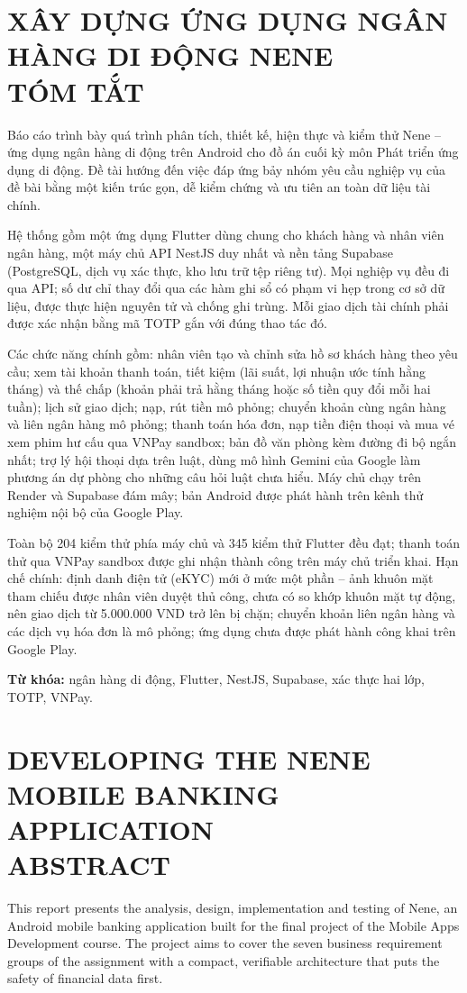 \chapter*{XÂY DỰNG ỨNG DỤNG NGÂN HÀNG DI ĐỘNG NENE\\TÓM TẮT}
Báo cáo trình bày quá trình phân tích, thiết kế, hiện thực và kiểm thử Nene -- ứng dụng ngân hàng di động trên Android cho đồ án cuối kỳ môn Phát triển ứng dụng di động. Đề tài hướng đến việc đáp ứng bảy nhóm yêu cầu nghiệp vụ của đề bài bằng một kiến trúc gọn, dễ kiểm chứng và ưu tiên an toàn dữ liệu tài chính.

Hệ thống gồm một ứng dụng Flutter dùng chung cho khách hàng và nhân viên ngân hàng, một máy chủ API NestJS duy nhất và nền tảng Supabase (PostgreSQL, dịch vụ xác thực, kho lưu trữ tệp riêng tư). Mọi nghiệp vụ đều đi qua API; số dư chỉ thay đổi qua các hàm ghi sổ có phạm vi hẹp trong cơ sở dữ liệu, được thực hiện nguyên tử và chống ghi trùng. Mỗi giao dịch tài chính phải được xác nhận bằng mã TOTP gắn với đúng thao tác đó.

Các chức năng chính gồm: nhân viên tạo và chỉnh sửa hồ sơ khách hàng theo yêu cầu; xem tài khoản thanh toán, tiết kiệm (lãi suất, lợi nhuận ước tính hằng tháng) và thế chấp (khoản phải trả hằng tháng hoặc số tiền quy đổi mỗi hai tuần); lịch sử giao dịch; nạp, rút tiền mô phỏng; chuyển khoản cùng ngân hàng và liên ngân hàng mô phỏng; thanh toán hóa đơn, nạp tiền điện thoại và mua vé xem phim hư cấu qua VNPay sandbox; bản đồ văn phòng kèm đường đi bộ ngắn nhất; trợ lý hội thoại dựa trên luật, dùng mô hình Gemini của Google làm phương án dự phòng cho những câu hỏi luật chưa hiểu. Máy chủ chạy trên Render và Supabase đám mây; bản Android được phát hành trên kênh thử nghiệm nội bộ của Google Play.

Toàn bộ 204 kiểm thử phía máy chủ và 345 kiểm thử Flutter đều đạt; thanh toán thử qua VNPay sandbox được ghi nhận thành công trên máy chủ triển khai. Hạn chế chính: định danh điện tử (eKYC) mới ở mức một phần -- ảnh khuôn mặt tham chiếu được nhân viên duyệt thủ công, chưa có so khớp khuôn mặt tự động, nên giao dịch từ 5.000.000 VND trở lên bị chặn; chuyển khoản liên ngân hàng và các dịch vụ hóa đơn là mô phỏng; ứng dụng chưa được phát hành công khai trên Google Play.

\textbf{Từ khóa:} ngân hàng di động, Flutter, NestJS, Supabase, xác thực hai lớp, TOTP, VNPay.

\newpage

\chapter*{DEVELOPING THE NENE MOBILE BANKING APPLICATION\\ABSTRACT}
This report presents the analysis, design, implementation and testing of Nene, an Android mobile banking application built for the final project of the Mobile Apps Development course. The project aims to cover the seven business requirement groups of the assignment with a compact, verifiable architecture that puts the safety of financial data first.

